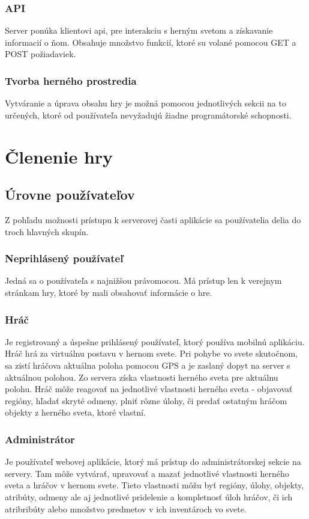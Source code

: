 \subsubsection{API}
Server ponúka klientovi api, pre interakciu s herným svetom a získavanie informacií o ňom. Obsahuje množstvo funkcií, ktoré su volané pomocou GET a POST požiadaviek.

\subsubsection{Tvorba herného prostredia}
Vytváranie a úprava obsahu hry je možná pomocou jednotlivých sekcii na to určených, ktoré od používateľa nevyžadujú žiadne programátorské schopnosti. 


\section{Členenie hry}
\subsection{Úrovne používateľov}
Z pohľadu možnosti prístupu k serverovej časti aplikácie sa používatelia delia do troch hlavných skupín. 

\subsubsection{Neprihlásený používateľ}
Jedná sa o používateľa s najnižšou právomocou. Má prístup len k verejnym stránkam hry, ktoré by mali obsahovať informácie o hre.

\subsubsection{Hráč}
Je registrovaný a úspešne prihlásený používateľ, ktorý používa mobilnú aplikáciu. Hráč hrá za virtuálnu postavu v hernom svete. Pri pohybe vo svete skutočnom, sa zistí hráčova aktuálna poloha pomocou GPS a je zaslaný dopyt na server s aktuálnou polohou. Zo servera získa vlastnosti herného sveta pre aktuálnu polohu. Hráč môže reagovať na jednotlivé vlastnosti herného sveta - objavovať regióny, hľadať skryté odmeny, plniť rôzne úlohy, či predať ostatným hráčom objekty z herného sveta, ktoré vlastní.

\subsubsection{Administrátor}
Je používateľ webovej aplikácie, ktorý má prístup do administrátorskej sekcie na servery. Tam môže vytvárať, upravovať a mazať jednotlivé vlastnosti herného sveta a hráčov v hernom svete. Tieto vlastnosti môžu byť regióny, úlohy, objekty, atribúty, odmeny ale aj jednotlivé pridelenie a kompletnosť úloh hráčov, či ich atribribúty alebo množstvo predmetov v ich inventároch   vo svete. 

